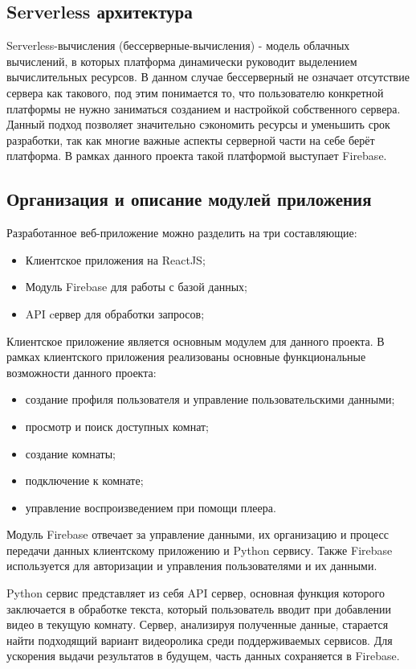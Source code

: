 \subsection{Serverless архитектура}
Serverless-вычисления (бессерверные-вычисления) - модель облачных вычислений, в которых платформа динамически руководит выделением вычислительных ресурсов. 
В данном случае бессерверный не означает отсутствие сервера как такового, под этим понимается то, что пользователю конкретной платформы не нужно заниматься созданием и настройкой собственного сервера. 
Данный подход позволяет значительно сэкономить ресурсы и уменьшить срок разработки, так как многие важные аспекты серверной части на себе берёт платформа. 
В рамках данного проекта такой платформой выступает Firebase.
 
\subsection{Организация и описание модулей приложения}
Разработанное веб-приложение можно разделить на три составляющие:
\begin{itemize}
 \item Клиентское приложения на ReactJS;
 \item Модуль Firebase для работы с базой данных;
 \item API cервер для обработки запросов;
\end{itemize}
 
Клиентское приложение является основным модулем для данного проекта. В рамках клиентского приложения реализованы основные функциональные возможности данного проекта:
\begin{itemize}
 \item создание профиля пользователя и управление пользовательскими данными;
 \item просмотр и поиск доступных комнат;
 \item создание комнаты;
 \item подключение к комнате;
 \item управление воспроизведением при помощи плеера.
\end{itemize}
 
Модуль Firebase отвечает за управление данными, их организацию и процесс передачи данных клиентскому приложению и Python сервису. Также Firebase используется для авторизации и управления пользователями и их данными.
 
Python сервис представляет из себя API сервер, основная функция которого заключается в обработке текста, который пользователь вводит при добавлении видео в текущую комнату. Сервер, анализируя полученные данные, старается найти подходящий вариант видеоролика среди поддерживаемых сервисов. Для ускорения выдачи результатов в будущем, часть данных сохраняется в Firebase.
 
